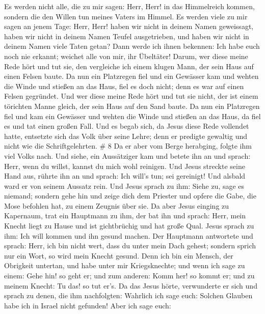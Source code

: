  Es werden nicht alle, die zu mir sagen: Herr, Herr! in das
Himmelreich kommen, sondern die den Willen tun meines Vaters im Himmel.
 Es werden viele zu mir sagen an jenem Tage: Herr, Herr!
haben wir nicht in deinem Namen geweissagt, haben wir nicht in deinem
Namen Teufel ausgetrieben, und haben wir nicht in deinem Namen viele
Taten getan?  Dann werde ich ihnen bekennen: Ich habe euch
noch nie erkannt; weichet alle von mir, ihr Übeltäter! 
Darum, wer diese meine Rede hört und tut sie, den vergleiche ich einem
klugen Mann, der sein Haus auf einen Felsen baute.  Da nun
ein Platzregen fiel und ein Gewässer kam und wehten die Winde und
stießen an das Haus, fiel es doch nicht; denn es war auf einen Felsen
gegründet.  Und wer diese meine Rede hört und tut sie
nicht, der ist einem törichten Manne gleich, der sein Haus auf den Sand
baute.  Da nun ein Platzregen fiel und kam ein Gewässer und
wehten die Winde und stießen an das Haus, da fiel es und tat einen
großen Fall.  Und es begab sich, da Jesus diese Rede
vollendet hatte, entsetzte sich das Volk über seine Lehre; 
denn er predigte gewaltig und nicht wie die Schriftgelehrten. \# 8
 Da er aber vom Berge herabging, folgte ihm viel Volks nach.
 Und siehe, ein Aussätziger kam und betete ihn an und
sprach: Herr, wenn du willst, kannst du mich wohl reinigen. 
Und Jesus streckte seine Hand aus, rührte ihn an und sprach: Ich will's
tun; sei gereinigt! Und alsbald ward er von seinem Aussatz rein.
 Und Jesus sprach zu ihm: Siehe zu, sage es niemand; sondern
gehe hin und zeige dich dem Priester und opfere die Gabe, die Mose
befohlen hat, zu einem Zeugnis über sie.  Da aber Jesus
einging zu Kapernaum, trat ein Hauptmann zu ihm, der bat ihn
 und sprach: Herr, mein Knecht liegt zu Hause und ist
gichtbrüchig und hat große Qual.  Jesus sprach zu ihm: Ich
will kommen und ihn gesund machen.  Der Hauptmann antwortete
und sprach: Herr, ich bin nicht wert, dass du unter mein Dach gehest;
sondern sprich nur ein Wort, so wird mein Knecht gesund. 
Denn ich bin ein Mensch, der Obrigkeit untertan, und habe unter mir
Kriegsknechte; und wenn ich sage zu einem: Gehe hin! so geht er; und zum
anderen: Komm her! so kommt er; und zu meinem Knecht: Tu das! so tut
er's.  Da das Jesus hörte, verwunderte er sich und sprach
zu denen, die ihm nachfolgten: Wahrlich ich sage euch: Solchen Glauben
habe ich in Israel nicht gefunden!  Aber ich sage euch:
